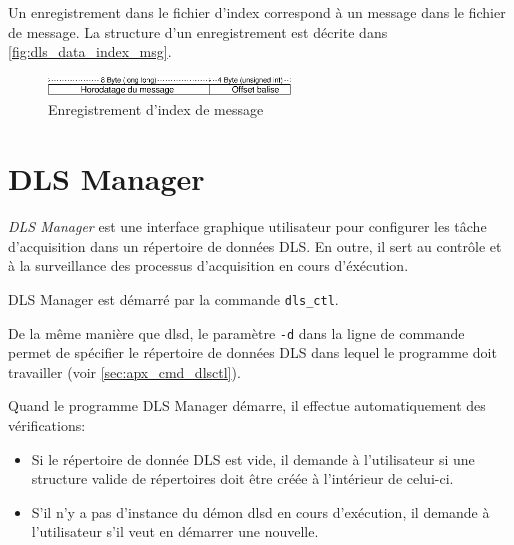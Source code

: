 \documentclass[a4paper,12pt,BCOR6mm,bibtotoc,idxtotoc]{scrbook}
\begin{document}
Un enregistrement dans le fichier d'index correspond \`a un message
dans le fichier de message. La structure d'un enregistrement est
d\'ecrite dans \autoref{fig:dls_data_index_msg}.

\begin{figure}[htb]
  \begin{center}
    \includegraphics[height=15pt]{bilder/dls_data_index_msg_fr}
  \end{center}
  \caption{Enregistrement d'index de message}
  \label{fig:dls_data_index_msg}
\end{figure}


\chapter{DLS Manager}
\label{sec:manager}

\textit{DLS Manager} est une interface graphique
utilisateur pour configurer les t\^ache
d'acquisition dans un r\'epertoire de donn\'ees
DLS. En outre, il sert au contr\^ole et \`a la surveillance des
processus d'acquisition en cours d'\'ex\'ecution.

DLS Manager est d\'emarr\'e par la commande \texttt{dls\_ctl}.

De la m\^eme mani\`ere que dlsd, le param\`etre \texttt{-d} dans la
ligne de commande permet de sp\'ecifier le r\'epertoire de donn\'ees
DLS dans lequel le programme doit travailler (voir
\autoref{sec:apx_cmd_dlsctl}).

Quand le programme DLS Manager d\'emarre, il effectue automatiquement
des v\'erifications:

\begin{itemize}
\item Si le r\'epertoire de donn\'ee DLS est vide, il demande \`a
  l'utilisateur si une structure valide de r\'epertoires doit \^etre
  cr\'e\'ee \`a l'int\'erieur de celui-ci.
\item S'il n'y a pas d'instance du d\'emon dlsd en cours d'ex\'ecution,
  il demande \`a l'utilisateur s'il veut en d\'emarrer une nouvelle.
  \end{itemize}

\end{document}
